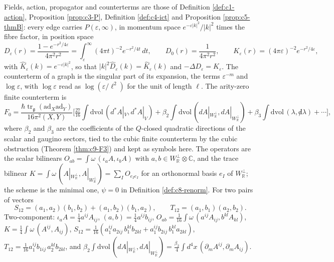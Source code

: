 \begin{definition}[Setting]
\label{def:c20-setting}
Fields, action, propagator and counterterms are those of Definition \ref{def:c1-action}, Proposition \ref{prop:c3-P}, Definition \ref{def:c4-ict} and Proposition \ref{prop:c5-thmB}: every edge carries $P(\varepsilon,\infty)$, in momentum space $e^{-\varepsilon|k|^2}/|k|^2$ times the fibre factor, in position space
\[
D_\varepsilon(r)=\frac{1-e^{-r^2/4\varepsilon}}{4\pi^2r^2}=\int_\varepsilon^\infty(4\pi t)^{-2}e^{-r^2/4t}\,dt,\qquad D_0(r)=\frac1{4\pi^2r^2},\qquad K_\varepsilon(r)=(4\pi\varepsilon)^{-2}e^{-r^2/4\varepsilon},
\]
with $\hat K_\varepsilon(k)=e^{-\varepsilon|k|^2}$, so that $|k|^2\hat D_\varepsilon(k)=\hat K_\varepsilon(k)$ and $-\Delta D_\varepsilon=K_\varepsilon$. The counterterm of a graph is the singular part of its expansion, the terms $\varepsilon^{-m}$ and $\log\varepsilon$, with $\log\varepsilon$ read as $\log(\varepsilon/\ell^2)$ for the unit of length $\ell$. The arity-zero finite counterterm is
\begin{equation}
F_0=\frac{\hbar\operatorname{tr}_{\mathfrak g}(\mathrm{ad}_X\mathrm{ad}_Y)}{16\pi^2(X,Y)}\Big[\tfrac{27}{16}\int\mathrm{dvol}\,(d^*A|_V,d^*A|_V)+\beta_2\int\mathrm{dvol}\,(dA|_{W_{\mathbb R}^\perp},dA|_{W_{\mathbb R}^\perp})+\beta_3\int\mathrm{dvol}\,(\lambda,{\not d}\lambda)+\cdots\Big],
\label{eq:c20-F0}
\end{equation}
where $\beta_2$ and $\beta_3$ are the coefficients of the $Q$-closed quadratic directions of the scalar and gaugino sectors, tied to the cubic finite counterterm by the cubic obstruction (Theorem \ref{thm:c9-F3}) and kept as symbols here. The operators are the scalar bilinears $O_{ab}=\int\omega\,(\iota_aA,\iota_bA)$ with $a,b\in W_{\mathbb R}^\perp\otimes\mathbb C$, and the trace bilinear $K=\int\omega\,(A|_{W_{\mathbb R}^\perp},A|_{W_{\mathbb R}^\perp})=\sum_IO_{e_Ie_I}$ for an orthonormal basis $e_I$ of $W_{\mathbb R}^\perp$; the scheme is the minimal one, $\psi=0$ in Definition \ref{def:c8-renorm}. For two pairs of vectors
\[
S_{12}=(a_1,a_2)(b_1,b_2)+(a_1,b_2)(b_1,a_2),\qquad T_{12}=(a_1,b_1)(a_2,b_2).
\]
Two-component: $\iota_aA=\tfrac14a^{ij}A_{ij}$, $(a,b)=\tfrac14a^{ij}b_{ij}$, $O_{ab}=\tfrac1{16}\int\omega\,(a^{ij}A_{ij},b^{kl}A_{kl})$, $K=\tfrac14\int\omega\,(A^{ij},A_{ij})$, $S_{12}=\tfrac1{16}(a_1^{ij}a_{2ij}\,b_1^{kl}b_{2kl}+a_1^{ij}b_{2ij}\,b_1^{kl}a_{2kl})$, $T_{12}=\tfrac1{16}a_1^{ij}b_{1ij}\,a_2^{kl}b_{2kl}$, and $\beta_2\int\mathrm{dvol}\,(dA|_{W_{\mathbb R}^\perp},dA|_{W_{\mathbb R}^\perp})=\tfrac{\beta_2}4\int d^4x\,(\partial_mA^{ij},\partial_mA_{ij})$.
\end{definition}

